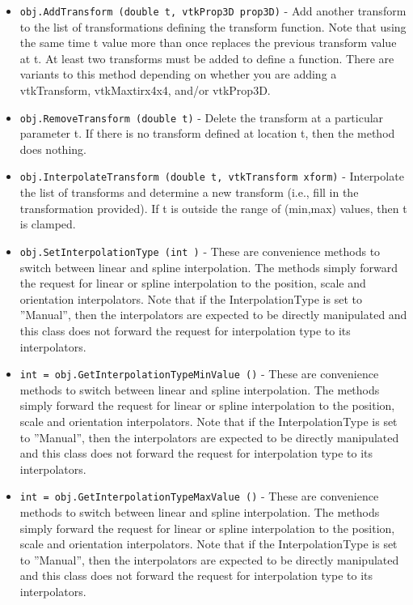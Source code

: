 \begin{itemize}
\item  \verb|obj.AddTransform (double t, vtkProp3D prop3D)| -  Add another transform to the list of transformations defining
 the transform function. Note that using the same time t value
 more than once replaces the previous transform value at t.
 At least two transforms must be added to define a function.
 There are variants to this method depending on whether you are
 adding a vtkTransform, vtkMaxtirx4x4, and/or vtkProp3D.

\item  \verb|obj.RemoveTransform (double t)| -  Delete the transform at a particular parameter t. If there is no
 transform defined at location t, then the method does nothing.

\item  \verb|obj.InterpolateTransform (double t, vtkTransform xform)| -  Interpolate the list of transforms and determine a new transform (i.e.,
 fill in the transformation provided). If t is outside the range of
 (min,max) values, then t is clamped.

\item  \verb|obj.SetInterpolationType (int )| -  These are convenience methods to switch between linear and spline
 interpolation. The methods simply forward the request for linear or
 spline interpolation to the position, scale and orientation
 interpolators. Note that if the InterpolationType is set to ''Manual'',
 then the interpolators are expected to be directly manipulated and
 this class does not forward the request for interpolation type to its
 interpolators.

\item  \verb|int = obj.GetInterpolationTypeMinValue ()| -  These are convenience methods to switch between linear and spline
 interpolation. The methods simply forward the request for linear or
 spline interpolation to the position, scale and orientation
 interpolators. Note that if the InterpolationType is set to ''Manual'',
 then the interpolators are expected to be directly manipulated and
 this class does not forward the request for interpolation type to its
 interpolators.

\item  \verb|int = obj.GetInterpolationTypeMaxValue ()| -  These are convenience methods to switch between linear and spline
 interpolation. The methods simply forward the request for linear or
 spline interpolation to the position, scale and orientation
 interpolators. Note that if the InterpolationType is set to ''Manual'',
 then the interpolators are expected to be directly manipulated and
 this class does not forward the request for interpolation type to its
 interpolators.


\end{itemize}
